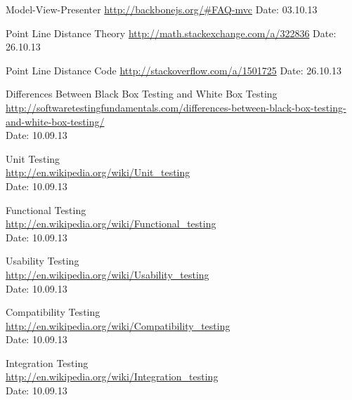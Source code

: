 \begin{thebibliography}{99}
	Model-View-Presenter\newline
	\href {http://backbonejs.org/\#FAQ-mvc}{http://backbonejs.org/\#FAQ-mvc}\newline
	Date: 03.10.13

	Point Line Distance Theory\newline
	\href {http://math.stackexchange.com/a/322836}{http://math.stackexchange.com/a/322836}\newline
	Date: 26.10.13

	Point Line Distance Code\newline
	\href {http://stackoverflow.com/a/1501725}{http://stackoverflow.com/a/1501725}\newline
	Date: 26.10.13

	Differences Between Black Box Testing and White Box Testing \\
	\href {http://softwaretestingfundamentals.com/differences-between-black-box-testing-and-white-box-testing/}{http://softwaretestingfundamentals.com/differences-between-black-box-testing-and-white-box-testing/} \\
	Date: 10.09.13

	Unit Testing \\
	\href {http://en.wikipedia.org/wiki/Unit_testing}{http://en.wikipedia.org/wiki/Unit\_testing} \\
	Date: 10.09.13

	Functional Testing \\
	\href {http://en.wikipedia.org/wiki/Functional_testing}{http://en.wikipedia.org/wiki/Functional\_testing} \\
	Date: 10.09.13

	Usability Testing \\
	\href {http://en.wikipedia.org/wiki/Usability_testing}{http://en.wikipedia.org/wiki/Usability\_testing} \\
	Date: 10.09.13

	Compatibility Testing \\
	\href {http://en.wikipedia.org/wiki/Compatibility_testing}{http://en.wikipedia.org/wiki/Compatibility\_testing} \\
	Date: 10.09.13

	Integration Testing \\
	\href{http://en.wikipedia.org/wiki/Integration_testing}{http://en.wikipedia.org/wiki/Integration\_testing} \\
	Date: 10.09.13


\end{thebibliography}
